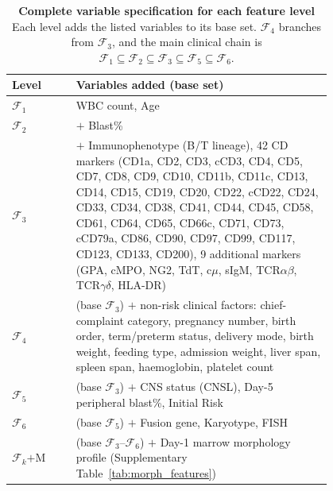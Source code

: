 \documentclass[pdflatex,sn-nature]{sn-jnl}
\begin{document}
\begin{appendices}
\begin{table}[ht]
\caption{\textbf{Complete variable specification for each feature level}
Each level adds the listed variables to its base
set. $\mathcal{F}_4$ branches from $\mathcal{F}_3$,
and the main clinical chain is
$\mathcal{F}_1\!\subseteq\!\mathcal{F}_2\!\subseteq\!\mathcal{F}_3\!
\subseteq\!\mathcal{F}_5\!\subseteq\!\mathcal{F}_6$.}
\label{tab:featurelist}
\centering
\footnotesize
\setlength{\tabcolsep}{4pt}
\begin{tabular}{@{}l p{0.80\linewidth}@{}}
\toprule
\textbf{Level} & \textbf{Variables added (base set)} \\
\midrule
$\mathcal{F}_1$ & WBC count, Age \\
$\mathcal{F}_2$ & $+$ Blast\% \\
$\mathcal{F}_3$ & $+$ Immunophenotype (B/T lineage), 42 CD markers (CD1a, CD2, CD3, cCD3, CD4, CD5, CD7, CD8, CD9, CD10, CD11b, CD11c, CD13, CD14, CD15, CD19, CD20, CD22, cCD22, CD24, CD33, CD34, CD38, CD41, CD44, CD45, CD58, CD61, CD64, CD65, CD66c, CD71, CD73, cCD79a, CD86, CD90, CD97, CD99, CD117, CD123, CD133, CD200), 9 additional markers (GPA, cMPO, NG2, TdT, c$\mu$, sIgM, TCR$\alpha\beta$, TCR$\gamma\delta$, HLA-DR) \\
$\mathcal{F}_4$ & (base $\mathcal{F}_3$) $+$ non-risk clinical factors: chief-complaint category, pregnancy number, birth order, term/preterm status, delivery mode, birth weight, feeding type, admission weight, liver span, spleen span, haemoglobin, platelet count \\
$\mathcal{F}_5$ & (base $\mathcal{F}_3$) $+$ CNS status (CNSL), Day-5 peripheral blast\%, Initial Risk \\
$\mathcal{F}_6$ & (base $\mathcal{F}_5$) $+$ Fusion gene, Karyotype, FISH \\
$\mathcal{F}_k$$+$M & (base $\mathcal{F}_3$--$\mathcal{F}_6$) $+$ Day-1 marrow morphology profile (Supplementary Table~\ref{tab:morph_features}) \\
\bottomrule
\end{tabular}
\end{table}


\clearpage


\end{appendices}
\end{document}
